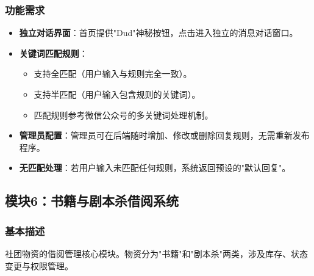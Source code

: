 \documentclass[a4paper,12pt]{article}
\begin{document}
\subsubsection{功能需求}
\begin{itemize}
    \item \textbf{独立对话界面}：首页提供"Dud"神秘按钮，点击进入独立的消息对话窗口。
    \item \textbf{关键词匹配规则}：
        \begin{itemize}
            \item 支持全匹配（用户输入与规则完全一致）。
            \item 支持半匹配（用户输入包含规则的关键词）。
            \item 匹配规则参考微信公众号的多关键词处理机制。
        \end{itemize}
    \item \textbf{管理员配置}：管理员可在后端随时增加、修改或删除回复规则，无需重新发布程序。
    \item \textbf{无匹配处理}：若用户输入未匹配任何规则，系统返回预设的"默认回复"。
\end{itemize}

\subsection{模块6：书籍与剧本杀借阅系统}
\subsubsection{基本描述}
社团物资的借阅管理核心模块。物资分为"书籍"和"剧本杀"两类，涉及库存、状态变更与权限管理。
\end{document}
